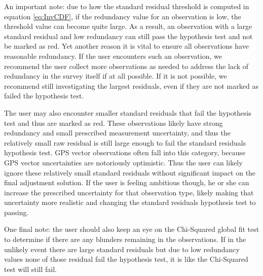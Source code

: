 An important note: due to how the standard residual threshold is computed in equation \ref{eq:InvCDF}, if the redundancy value for an observation is low, the threshold value can become quite large. As a result, an observation with a large standard residual and low redundancy can still pass the hypothesis test and not be marked as red. Yet another reason it is vital to ensure all observations have reasonable redundancy. If the user encounters such an observation, we recommend the user collect more observations as needed to address the lack of redundancy in the survey itself if at all possible. If it is not possible, we recommend still investigating the largest residuals, even if they are not marked as failed the hypothesis test.

The user may also encounter smaller standard residuals that fail the hypothesis test and thus are marked as red. These observations likely have strong redundancy and small prescribed measurement uncertainty, and thus the relatively small raw residual is still large enough to fail the standard residuals hypothesis test. GPS vector observations often fall into this category, because GPS vector uncertainties are notoriously optimistic. Thus the user can likely ignore these relatively small standard residuals without significant impact on the final adjustment solution. If the user is feeling ambitious though, he or she can increase the prescribed uncertainty for that observation type, likely making that uncertainty more realistic and changing the standard residuals hypothesis test to passing.

One final note: the user should also keep an eye on the Chi-Squared global fit test to determine if there are any blunders remaining in the observations. If in the unlikely event there are large standard residuals but due to low redundancy values none of those residual fail the hypothesis test, it is like the Chi-Squared test will still fail.
